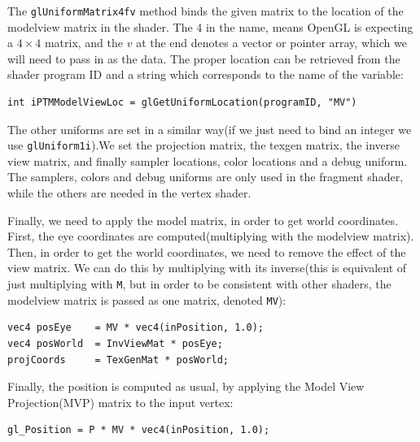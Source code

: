 \documentclass[]{article}
\begin{document}
The \verb|glUniformMatrix4fv| method binds the given matrix to the location of the modelview matrix in the shader. The 4 in the name, means OpenGL is expecting a $4 \times 4$ matrix, and the $v$ at the end denotes a vector or pointer array, which we will need to pass in as the data. The proper location can be retrieved from the shader program ID and a string which corresponds to the name of the variable:
\begin{verbatim}
int iPTMModelViewLoc = glGetUniformLocation(programID, "MV")
\end{verbatim}
The other uniforms are set in a similar way(if we just need to bind an integer we use \verb|glUniform1i|).We set the projection matrix, the texgen matrix, the inverse view matrix, and finally sampler locations, color locations and a debug uniform. The samplers, colors and debug uniforms are only used in the fragment shader, while the others are needed in the vertex shader. 

Finally, we need to apply the model matrix, in order to get world coordinates. First, the eye coordinates are computed(multiplying with the modelview matrix). Then, in order to get the world coordinates, we need to remove the effect of the view matrix. We can do this by multiplying with its inverse(this is equivalent of just multiplying with \verb|M|, but in order to be consistent with other shaders, the modelview matrix is passed as one matrix, denoted \verb|MV|):
\begin{verbatim}
vec4 posEye    = MV * vec4(inPosition, 1.0);
vec4 posWorld  = InvViewMat * posEye;
projCoords     = TexGenMat * posWorld;
\end{verbatim}

Finally, the position is computed as usual, by applying the Model View Projection(MVP) matrix to the input vertex:
\begin{verbatim}
gl_Position = P * MV * vec4(inPosition, 1.0);
\end{verbatim}
\end{document}
